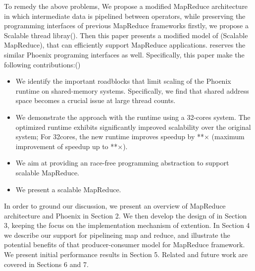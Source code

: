 To remedy the above problems, 
We propose a modified MapReduce architecture in
which intermediate data is pipelined between operators,
while preserving the programming interfaces of previous MapReduce frameworks
firstly, we propose a Scalable thread libray(\myth).
Then this paper presents a modified model of \myds(Scalable MapReduce), 
that can efficiently support MapReduce applications.
\myds reserves the similar Phoenix programing interfaces as well.
Specifically, this paper make the following contributions:()
\begin{itemize}
  \item We identify the important roadblocks 
  that limit scaling of the Phoenix runtime on shared-memory systems. 
  Specifically, we find that shared address space
   becomes a crucial issue at large thread counts.

  \item We demonstrate the approach with the \myds runtime using a 32-cores system. The optimized runtime exhibits significantly improved scalability over the
original system; For 32cores, the new runtime improves speedup by **× 
(maximum improvement of speedup up to **×).

  \item We aim at providing an race-free programming abstraction to
support scalable MapReduce.
  \item We present a scalable MapReduce.
\end{itemize}

In order to ground our discussion, we present an overview
of MapReduce architecture and Phoenix in Section 2. 
We then develop the design of \myth in Section 3, 
keeping the focus on the implementation mechanism of extention. 
In Section 4 we describe our support for pipelineing map and reduce,
and illustrate the potential benefits of that producer-consumer model for MapReduce framework. 
We present initial performance results in Section 5. 
Related and future work are covered in Sections 6 and 7.

